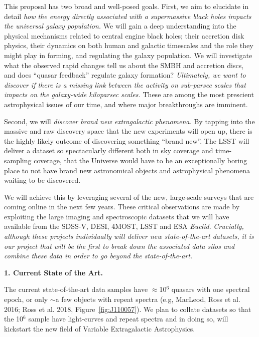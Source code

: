 \documentclass[oneside, a4paper, onecolumn, 11pt]{article}
\begin{document}
\smallskip
\smallskip
\noindent
This proposal has two broad and well-posed goals.  First, we aim to
elucidate in detail {\it how the energy directly associated with a
supermassive black holes impacts the universal galaxy population.}  We
will gain a deep understanding into the physical mechanisms related to
central engine black holes; their accretion disk physics, their
dynamics on both human and galactic timescales and the role they might
play in forming, and regulating the galaxy population. 
We will investigate what the observed rapid changes tell us about the SMBH and accretion discs, 
and does ``quasar feedback'' regulate galaxy formation?
{\it Ultimately, we want to discover if there is a missing link between the 
activity on sub-parsec scales that impacts on the galaxy-wide kiloparsec scales.}
These are among the most prescient astrophysical issues of our time, 
and where major breakthroughs are imminent.

\smallskip
\smallskip
\noindent
Second, we will {\it discover brand new extragalactic phenomena.}  By
tapping into the massive and raw discovery space that the new
experiments will open up, there is the highly likely outcome of
discovering something ``brand new''. The LSST will deliver a dataset
so spectacularly different both in sky coverage and time-sampling
coverage, that the Universe would have to be an exceptionally boring
place to not have brand new astronomical objects and astrophysical
phenomena waiting to be discovered.

\smallskip
\smallskip
\noindent
We will achieve this by leveraging several of the new, large-scale
surveys that are coming online in the next few years. These critical
observations are made by exploiting the large imaging and
spectroscopic datasets that we will have available from the SDSS-V,
DESI, 4MOST, LSST and ESA {\it Euclid}. {\it Crucially, although these 
projects individually will deliver new state-of-the-art datasets, it is 
our project that will be the first to break down the associated data 
silos and combine these data in order to go beyond the state-of-the-art.}

\medskip
\medskip
\noindent
\large
{\bf{\textcolor{Cerulean}{1. Current State of the Art.}}}
\normalsize

\smallskip
\noindent
The current state-of-the-art data samples have $\approx$10$^{6}$
quasars with one spectral epoch, or only $\sim$a few objects with
repeat spectra (e.g, MacLeod, Ross et al. 2016; Ross et al. 2018, Figure~\ref{fig:J110057}).  We
plan to collate datasets so that the 10$^{6}$ sample have
light-curves and repeat spectra and in doing so, will kickstart the
new field of Variable Extragalactic Astrophysics.
\end{document}
